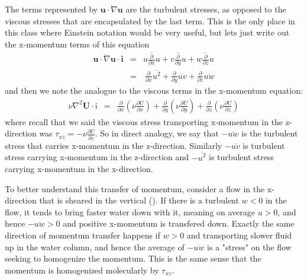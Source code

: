 \documentclass[11pt]{article}
\begin{document}
The terms represented by  $\overline{\mathbf{u}\cdot\nabla \mathbf{u}}$ are the
turbulent stresses, as opposed to the viscous stresses that are encapsulated by
the last term.  This is the only place in this class where Einstein notation
would be very useful, but lets just write out the x-momentum terms of this
equation
\begin{eqnarray*}
    \overline{\mathbf{u}\cdot\nabla \mathbf{u}}\cdot\mathbf{i} & = &\overline{u
\frac{\partial}{\partial x} u} + \overline{v\frac{\partial}{\partial y} u} +
\overline{w\frac{\partial}{\partial z} u}  \\ & = &
\ \frac{\partial}{\partial x} \overline{u^2} + \frac{\partial}{\partial y}
\overline{u v} + \frac{\partial}{\partial z} \overline{uw} 
\end{eqnarray*}
and then we note the analogue to the viscous terms in the x-momentum equation:
\begin{eqnarray*}
    \nu\nabla^2 \mathbf{U}\cdot\mathrm{i} & = & \frac{\partial}{\partial
x}\left( \nu \frac{\partial U}{\partial x}\right) + \frac{\partial}{\partial
y}\left( \nu \frac{\partial U}{\partial y}\right) + \frac{\partial}{\partial
z}\left( \nu \frac{\partial U}{\partial z}\right) 
\end{eqnarray*}
where recall that we said the viscous stress transporting x-momentum in the
z-direction was $\tau_{xz} = -\nu\frac{\partial U}{\partial z}$.  So in direct
analogy, we say that $-\overline{uw}$ is the turbulent stress that carries
x-momentum in the z-direction.  Similarly $-\overline{uv}$ is turbulent stress
carrying x-momentum in the z-direction and $-\overline{u^2}$ is turbulent
stress carrying x-momentum in the x-direction.  

To better understand this transfer of momentum, consider a  flow in the
x-direction that is sheared in the vertical ().  If
there is a turbulent $w<0$ in the flow, it tends to bring faster water down
with it, meaning on average $u>0$, and hence $-\overline{uw} > 0$ and positive
x-momentum is transfered down.  Exactly the same direction of momentum transfer
happens if $w>0$ and transporting slower fluid up in the water column, and
hence the average of $-\overline{uw}$ is a "stress" on the flow seeking to
homogenize the momentum.  This is the same sense that the momentum is
homogenized molecularly by $\tau_{xz}$.  
\end{document}
